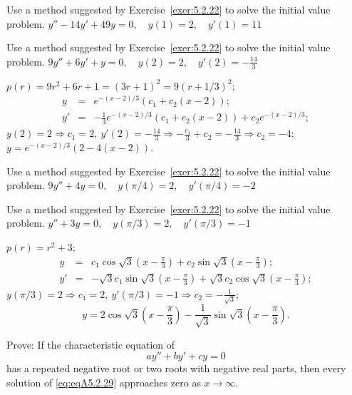 \documentclass{ximera}
\begin{document}
\begin{problem}\label{exer:5.2.25}  Use a method
suggested by Exercise~\ref{exer:5.2.22} to solve the initial value
problem.
$y''-14y'+49y=0, \quad  y(1)=2,\quad y'(1)=11$
\end{problem}

\begin{problem}\label{exer:5.2.26}  Use a method
suggested by Exercise~\ref{exer:5.2.22} to solve the initial value
problem.
$9y''+6y'+y=0, \quad  y(2)=2,\quad y'(2)=-\frac{14}{3}$
\begin{solution}
$p(r)=9r^2+6r+1=(3r+1)^2=9(r+1/3)^2$;
\begin{eqnarray*}
y&=&e^{-(x-2)/3}\left(c_1+c_2(x-2)\right);\\
y'&=&-\frac{1}{3}e^{-(x-2)/3}\left(c_1+c_2(x-2)\right)
+c_2e^{-(x-2)/3};
\end{eqnarray*}
$y(2)=2\Rightarrow c_1=2,\
y'(2)=-\frac{14}{3}\Rightarrow -\frac{c_1}{3}+c_2=-\frac{14}{3}
\Rightarrow c_2=-4$;\;
$y=e^{-(x-2)/3}\left(2-4(x-2)\right)$.
\end{solution}
\end{problem}

\begin{problem}\label{exer:5.2.27}  Use a method
suggested by Exercise~\ref{exer:5.2.22} to solve the initial value
problem.
$9y''+4y=0, \quad  y(\pi/4)=2,\quad y'(\pi/4)=-2$
\end{problem}

\begin{problem}\label{exer:5.2.28}  Use a method
suggested by Exercise~\ref{exer:5.2.22} to solve the initial value
problem.
$y''+3y=0, \quad  y(\pi/3)=2,\quad y'(\pi/3)=-1$
\begin{solution}
$p(r)=r^2+3$;
\begin{eqnarray*}
y&=&c_1\cos \sqrt3\left(x-\frac{\pi}{3}\right)+c_2\sin
\sqrt3\left(x-\frac{\pi}{3}\right);\\
y'&=&-\sqrt3c_1\sin
\sqrt3\left(x-\frac{\pi}{3}\right)+\sqrt3c_2\cos
\sqrt3\left(x-\frac{\pi}{3}\right);
\end{eqnarray*}
$y(\pi/3)=2\Rightarrow c_1=2,\ y'(\pi/3)=-1\Rightarrow
c_2=-\frac{1}{\sqrt3}$;\;
$$
y=2\cos \sqrt3\left(x-\frac{\pi}{3}\right)-\frac{1}{\sqrt3}\sin
\sqrt3\left(x-\frac{\pi}{3}\right).
$$
\end{solution}
\end{problem}

\begin{problem}\label{exer:5.2.29}
Prove: If the characteristic equation of \begin{equation}\label{eq:eqA5.2.29}
ay''+by'+cy=0
\end{equation}
has a repeated negative root or two roots with negative real parts, then
every solution of \ref{eq:eqA5.2.29} approaches zero as $x\to\infty$.
\end{problem}
\end{document}
